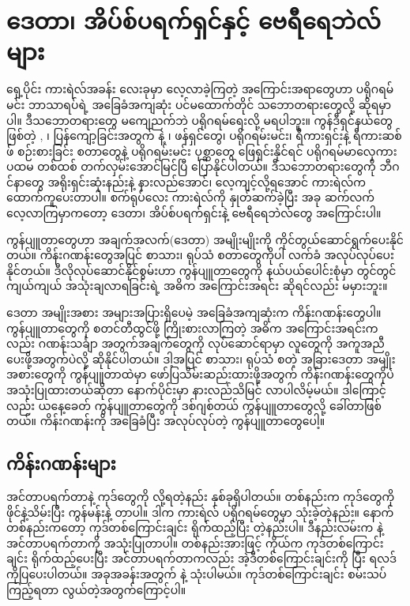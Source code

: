 \chapter{ဒေတာ၊ အိပ်စ်ပရက်ရှင်နှင့် ဗေရီရေဘဲလ်များ} \label{ch:ch05}

ရှေ့ပိုင်း ကားရဲလ်အခန်း လေးခုမှာ လေ့လာခဲ့ကြတဲ့ အကြောင်းအရာတွေဟာ ပရိုဂရမ်မင်း ဘာသာရပ်ရဲ့ အခြေခံအကျဆုံး ပင်မထောက်တိုင် သဘောတရားတွေလို့ ဆိုရမှာပါ။ ဒီသဘောတရားတွေ မကျေညက်ဘဲ ပရိုဂရမ်ရေးလို့ မရပါဘူး။ ကွန်ဒီရှင်နယ်တွေဖြစ်တဲ့ , ၊ ပြန်ကျော့ခြင်းအတွက်  နဲ့  ၊ ဖန်ရှင်တွေ၊  ပရိုဂရမ်းမင်း၊ ရီကားရှင်းနဲ့ ရီကားဆစ်ဖ် စဉ်းစားခြင်း စတာတွေနဲ့ ပရိုဂရမ်းမင်း ပုစ္ဆာတွေ ဖြေရှင်းနိုင်ရင် ပရိုဂရမ်မာလှေကား ပထမ တစ်ထစ် တက်လှမ်းအောင်မြင်ပြီ ပြောနိုင်ပါတယ်။ ဒီသဘောတရားတွေကို ဘီဂင်နာတွေ အရိုးရှင်းဆုံးနည်းနဲ့ နားလည်အောင်၊ လေ့ကျင့်လို့ရအောင် ကားရဲလ်က ထောက်ကူပေးတာပါ။ စက်ရုပ်လေး ကားရဲလ်ကို နှုတ်ဆက်ခဲ့ပြီး အခု ဆက်လက်လေ့လာကြမှာကတော့ ဒေတာ၊ အိပ်စ်ပရက်ရှင်းနဲ့ ဗေရီရေဘဲလ်တွေ အကြောင်းပါ။ 

ကွန်ပျူတာတွေဟာ အချက်အလက်(ဒေတာ) အမျိုးမျိုးကို ကိုင်တွယ်ဆောင်ရွက်ပေးနိုင်တယ်။ ကိန်း\allowbreak ဂဏန်းတွေအပြင် စာသား၊ ရုပ်သံ စတာတွေကိုပါ လက်ခံ အလုပ်လုပ်ပေးနိုင်တယ်။ ဒီလိုလုပ်ဆောင်နိုင်စွမ်းဟာ ကွန်ပျူတာတွေကို နယ်ပယ်ပေါင်းစုံမှာ တွင်တွင်ကျယ်ကျယ် အသုံးချလာရခြင်းရဲ့ အဓိက အကြောင်းအရင်း ဆိုရင်လည်း မမှားဘူး။

ဒေတာ အမျိုးအစား အများအပြားရှိပေမဲ့ အခြေခံအကျဆုံးက ကိန်းဂဏန်းတွေပါ။ ကွန်ပျူတာတွေကို စတင်တီထွင်ဖို့ ကြိုးစားလာကြတဲ့ အဓိက အကြောင်းအရင်းကလည်း ဂဏန်းသင်္ချာ အတွက်အချက်တွေကို လုပ်ဆောင်ရာမှာ လူတွေကို အကူအညီ ပေးဖို့အတွက်ပဲလို့ ဆိုနိုင်ပါတယ်။ ဒါ့အပြင် စာသား၊ ရုပ်သံ စတဲ့ အခြားဒေတာ အမျိုးအစားတွေကို ကွန်ပျူတာထဲမှာ ဖော်ပြသိမ်းဆည်းထားဖို့အတွက် ကိန်းဂဏန်းတွေကိုပဲ အသုံးပြုထားတယ်ဆိုတာ နောက်ပိုင်းမှာ နားလည်သိမြင် လာပါလိမ့်မယ်။ ဒါကြောင့်လည်း ယနေ့ခေတ် ကွန်ပျူတာတွေကို ဒစ်ဂျစ်တယ် ကွန်ပျူတာတွေလို့ ခေါ်တာဖြစ်တယ်။ ကိန်းဂဏန်းကို အခြေခံပြီး အလုပ်လုပ်တဲ့ ကွန်ပျူတာတွေပေါ့။ 

\section{ကိန်းဂဏန်းများ}


 အင်တာပရက်တာနဲ့  ကုဒ်တွေကို  လို့ရတဲ့နည်း နှစ်ခုရှိပါတယ်။ တစ်နည်းက ကုဒ်တွေကို  ဖိုင်နဲ့သိမ်းပြီး  ကွန်မန်းနဲ့  တာပါ။ ဒါက ကားရဲလ် ပရိုဂရမ်တွေမှာ သုံးခဲ့တဲ့နည်း။ နောက်တစ်နည်းကတော့ ကုဒ်တစ်ကြောင်းချင်း ရိုက်ထည့်ပြီး  တဲ့နည်းပါ။ ဒီနည်းလမ်းက  နဲ့ အင်တာပရက်တာကို အသုံးပြုတာပါ။ တစ်နည်းအားဖြင့် ကိုယ်က ကုဒ်တစ်ကြောင်းချင်း ရိုက်ထည့်ပေးပြီး အင်တာပရက်တာကလည်း အဲ့ဒီတစ်ကြောင်းချင်းကို  ပြီး ရလဒ်ကိုပြပေးပါတယ်။ အခုအခန်းအတွက်  နဲ့ သုံးပါမယ်။ ကုဒ်တစ်ကြောင်းချင်း စမ်းသပ်ကြည့်ရတာ လွယ်တဲ့အတွက်ကြောင့်ပါ။ 

